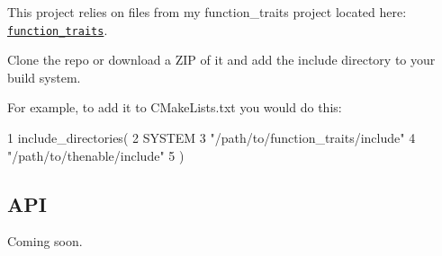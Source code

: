 This project relies on files from my {\ttfamily function\+\_\+traits} project located here\+: \href{https://github.com/novacrazy/function_traits}{\tt function\+\_\+traits}.

Clone the repo or download a Z\+IP of it and add the {\ttfamily \textquotesingle{}include\textquotesingle{}} directory to your build system.

For example, to add it to {\ttfamily C\+Make\+Lists.\+txt} you would do this\+:


\begin{DoxyCode}
1 include\_directories(
2     SYSTEM
3     "/path/to/function\_traits/include"
4     "/path/to/thenable/include"
5 )
\end{DoxyCode}


\subsection*{A\+PI}

Coming soon. 